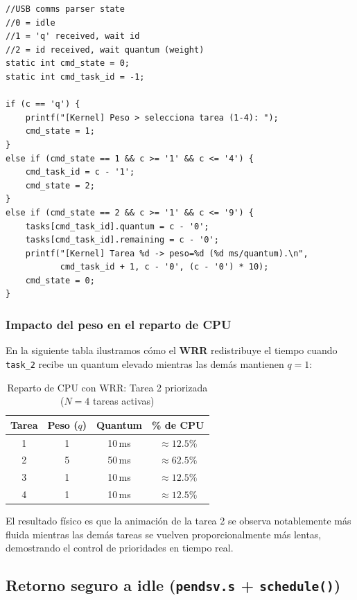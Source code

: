 \documentclass[12pt,letterpaper]{article}
\begin{document}
\begin{lstlisting}[style=modernc, caption={Parser de comandos de peso en \texttt{isr\_systick()}}]
//USB comms parser state
//0 = idle
//1 = 'q' received, wait id
//2 = id received, wait quantum (weight)
static int cmd_state = 0;
static int cmd_task_id = -1;

if (c == 'q') {
    printf("[Kernel] Peso > selecciona tarea (1-4): ");
    cmd_state = 1;
}
else if (cmd_state == 1 && c >= '1' && c <= '4') {
    cmd_task_id = c - '1';
    cmd_state = 2;
}
else if (cmd_state == 2 && c >= '1' && c <= '9') {
    tasks[cmd_task_id].quantum = c - '0';
    tasks[cmd_task_id].remaining = c - '0';
    printf("[Kernel] Tarea %d -> peso=%d (%d ms/quantum).\n",
           cmd_task_id + 1, c - '0', (c - '0') * 10);
    cmd_state = 0;
}
\end{lstlisting}
 
\subsubsection*{Impacto del peso en el reparto de CPU}
 
En la siguiente tabla ilustramos cómo el \textbf{WRR} redistribuye el tiempo cuando \texttt{task\_2} recibe un quantum elevado mientras las demás mantienen $q = 1$:
 
\begin{table}[H]
  \centering
  \caption{Reparto de CPU con WRR: Tarea 2 priorizada ($N=4$ tareas activas)}
  \begin{tabular}{cccc}
    \textbf{Tarea} & \textbf{Peso ($q$)} & \textbf{Quantum} & \textbf{\% de CPU} \\
    \hline
    1 & 1 & 10\,ms & $\approx 12.5\%$ \\
    2 & 5 & 50\,ms & $\approx 62.5\%$ \\
    3 & 1 & 10\,ms & $\approx 12.5\%$ \\
    4 & 1 & 10\,ms & $\approx 12.5\%$ \\
  \end{tabular}
\end{table}
 
El resultado físico es que la animación de la tarea 2 se observa notablemente más fluida mientras las demás tareas se vuelven proporcionalmente más lentas, demostrando el control de prioridades en tiempo real.

\subsection*{Retorno seguro a idle (\texttt{pendsv.s} + \texttt{schedule()})}
\end{document}
